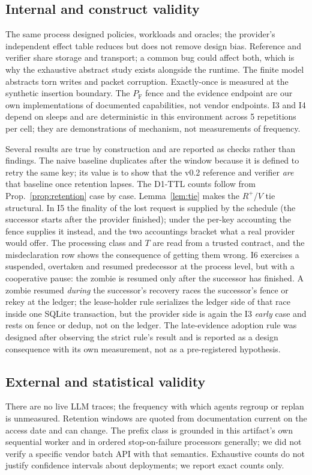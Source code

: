 \documentclass[conference,10pt]{IEEEtran}
\newcommand{\PF}{P_{\mathrm{F}}}
\begin{document}
\subsection{Internal and construct validity}
The same process designed policies, workloads and oracles; the provider's independent effect table reduces but does not remove design bias. Reference and verifier share storage and transport; a common bug could affect both, which is why the exhaustive abstract study exists alongside the runtime. The finite model abstracts torn writes and packet corruption. Exactly-once is measured at the synthetic insertion boundary. The $\PF$ fence and the evidence endpoint are our own implementations of documented capabilities, not vendor endpoints. I3 and I4 depend on sleeps and are deterministic in this environment across 5 repetitions per cell; they are demonstrations of mechanism, not measurements of frequency.

Several results are true by construction and are reported as checks rather than findings. The naive baseline duplicates after the window because it is defined to retry the same key; its value is to show that the v0.2 reference and verifier \emph{are} that baseline once retention lapses. The D1-TTL counts follow from Prop.~\ref{prop:retention} case by case. Lemma~\ref{lem:tie} makes the $R^{+}$/$V$ tie structural. In I5 the finality of the lost request is supplied by the schedule (the successor starts after the provider finished); under the per-key accounting the fence supplies it instead, and the two accountings bracket what a real provider would offer. The processing class and $T$ are read from a trusted contract, and the misdeclaration row shows the consequence of getting them wrong. I6 exercises a suspended, overtaken and resumed predecessor at the process level, but with a cooperative pause: the zombie is resumed only after the successor has finished. A zombie resumed \emph{during} the successor's recovery races the successor's fence or rekey at the ledger; the lease-holder rule serializes the ledger side of that race inside one SQLite transaction, but the provider side is again the I3 \emph{early} case and rests on fence or dedup, not on the ledger. The late-evidence adoption rule was designed after observing the strict rule's result and is reported as a design consequence with its own measurement, not as a pre-registered hypothesis.

\subsection{External and statistical validity}
There are no live LLM traces; the frequency with which agents regroup or replan is unmeasured. Retention windows are quoted from documentation current on the access date and can change. The prefix class is grounded in this artifact's own sequential worker and in ordered stop-on-failure processors generally; we did not verify a specific vendor batch API with that semantics. Exhaustive counts do not justify confidence intervals about deployments; we report exact counts only.
\end{document}
